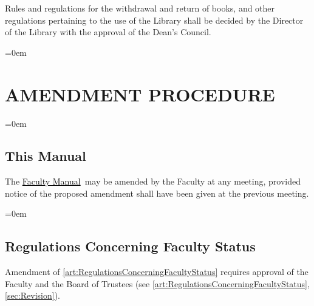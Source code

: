\documentclass{manual}
\let\stdsection\section %
\renewcommand\section{\newpage\stdsection}
\newcommand{\keyword}[1]{\textcolor{black}{#1}}
\newcommand{\facman}{\keyword{\underline{Faculty Manual}}~}
\let\oldsection\section
\renewcommand\section{\leftskip=0em\oldsection}
\let\oldsubsection\subsection
\renewcommand\subsection{\leftskip=0em\oldsubsection}
\begin{document}
Rules and regulations for the withdrawal and return of books, and other regulations pertaining to the use of the Library shall be decided by the Director of the Library with the approval of the Dean's Council.

\section{AMENDMENT PROCEDURE}\label{art:Amendment}

\subsection{This Manual}
The \facman may be amended by the Faculty at any meeting, provided notice of the proposed amendment shall have been given at the previous meeting.

\subsection{Regulations Concerning Faculty Status}
Amendment of \cref{art:RegulationsConcerningFacultyStatus} requires approval of the Faculty and the Board of Trustees (see \cref{art:RegulationsConcerningFacultyStatus}, \cref{sec:Revision}).
\end{document}
